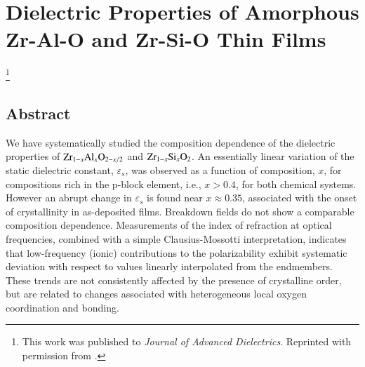 \chapter{Dielectric Properties of Amorphous Zr-Al-O and Zr-Si-O Thin Films}

{\let\thefootnote\relax\footnote{{
This work was published to \emph{Journal of Advanced Dielectrics}. Reprinted with permission from \cite{Naoi2015}.
}}}

\section{Abstract}
We have systematically studied the composition dependence of the dielectric properties of $\textnormal{Zr}_{1-x}\textnormal{Al}_{x}\textnormal{O}_{2-x/2}$ and $\textnormal{Zr}_{1-x}\textnormal{Si}_{x}\textnormal{O}_{2}$.
An essentially linear variation of the static dielectric constant, $\varepsilon_s$, was observed as a function of composition, $x$, for compositions rich in the p-block element, i.e., $x>0.4$, for both chemical systems. However an abrupt change in $\varepsilon_s$ is found near $x \approx 0.35$, associated with the onset of crystallinity in as-deposited films. Breakdown fields do not show a comparable composition dependence. Measurements of the index of refraction at optical frequencies, combined with a simple Clausius-Mossotti interpretation, indicates that low-frequency (ionic) contributions to the polarizability exhibit systematic deviation with respect to values linearly interpolated from the endmembers. These trends are not consistently affected by the presence of crystalline order, but are related to changes associated with heterogeneous local oxygen coordination and bonding.

